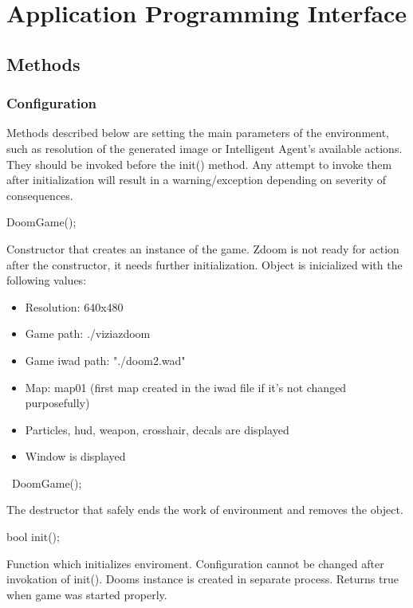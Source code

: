 
\chapter{Application Programming Interface}
\section{Methods}
\subsection{Configuration}
Methods described below are setting the main parameters of the environment, such as resolution of the generated image or Intelligent Agent's available actions. They should be invoked before the init() method. Any attempt to invoke them after initialization will result in a warning/exception depending on severity of consequences. 
\vspace{20pt}

\begin{clinee}
DoomGame();
\end{clinee}

Constructor that creates an instance of the game. Zdoom is not ready for action after the constructor, it needs further initialization. Object is inicialized with the following values:
	\begin{itemize}
\item Resolution: 640x480
\item Game path: ./viziazdoom
\item Game iwad path: "./doom2.wad"
\item Map: map01 (first map created in the iwad file if it's not changed purposefully)
\item Particles, hud, weapon, crosshair, decals are displayed 
\item Window is displayed 
	\end{itemize}


\vspace{20pt}
\begin{clinee}
~DoomGame();
\end{clinee}

The destructor that safely ends the work of environment and removes the object.


\vspace{20pt}
\begin{clinee}
bool init();
\end{clinee}

Function which initializes enviroment. Configuration cannot be changed after invokation of init(). Dooms instance is created in separate process. Returns true when game was started properly. 


